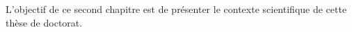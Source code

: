 L'objectif de ce second chapitre est de présenter le contexte
scientifique de cette thèse de doctorat.


